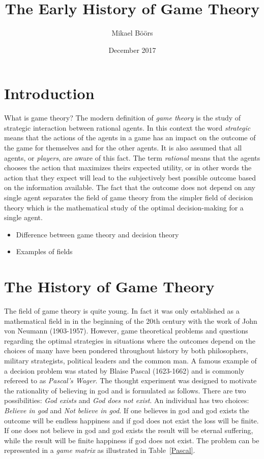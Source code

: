 \documentclass{article}
\title{The Early History of Game Theory}
\author{Mikael Böörs}
\affil{University of Gothenburg}
\date{December 2017}
\theoremstyle{definition}
\theoremstyle{remark}
\begin{document}
\maketitle
\thispagestyle{empty}
\newpage
\cleardoublepage
\setcounter{page}{1}

\section{Introduction}
What is game theory? The modern definition of \emph{game theory} is
the study of strategic interaction between rational agents. In this
context the word \emph{strategic} means that the actions of the agents
in a game has an impact on the outcome of the game for themselves and
for the other agents. It is also assumed that all agents, or \emph{players}, are aware of
this fact. The term \emph{rational} means that the agents chooses the
action that maximizes theirs expected utility, or in other words the
action that they expect will lead to the subjectively best possible
outcome based on the information available. The fact that the outcome
does not depend on any single agent separates the field of game theory
from the simpler field of decision theory which is the mathematical
study of the optimal decision-making for a single agent. 

\begin{itemize}
    \item Difference between game theory and decision theory
    \item Examples of fields 
\end{itemize}

\section{The History of Game Theory}\label{The History of Game Theory}

The field of game theory is quite young. In fact it was only established
as a mathematical field in in the beginning of the 20th century with
the work of John von Neumann (1903-1957). However, game
theoretical problems and questions regarding the optimal strategies in
situations where the outcomes depend on the choices of many have been
pondered throughout history by both philosophers, military
strategists, political leaders and the common man. A famous example of
a decision problem was stated by Blaise Pascal (1623-1662) and is
commonly refereed to as \emph{Pascal's Wager}. The thought experiment
was designed to motivate the rationality of believing in god and is
formulated as follows. There are two possibilities: \emph{God exists}
and \emph{God does not exist}. An individual has two choices:
\emph{Believe in god} and \emph{Not believe in god}. If one believes
in god and god exists the outcome will be endless happiness and if god
does not exist the loss will be finite. If one does not believe in god
and god exists the result will be eternal suffering, while the result
will be finite happiness if god does not exist. The problem can be
represented in a \emph{game matrix} as illustrated in Table~\ref{Pascal}.  
\end{document}
